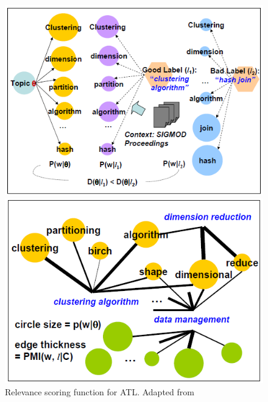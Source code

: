 \begin{figure}
	\begin{minipage}[t]{0.5\textwidth}
		\includegraphics[width=\textwidth]{gfx/Mei/MeiGoodLabel.png}
	\end{minipage}
	\begin{minipage}[t]{0.512\textwidth}
		\includegraphics[width=\textwidth]{gfx/Mei/MeiScoring.png}
	\end{minipage}
	\caption[Relevance scoring function for \ac{ATL}]{Relevance scoring function for \ac{ATL}. Adapted from \cite{Mei2007}}
	\label{pic:ScoringFunction}
\end{figure}


